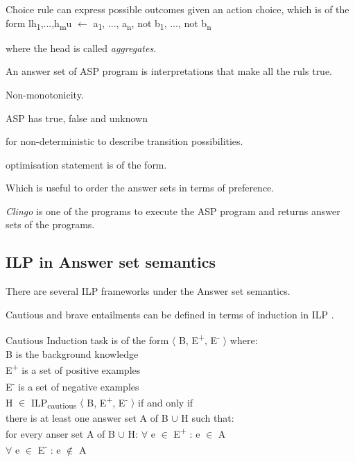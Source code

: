 \documentclass[12pt,twoside]{report}
\begin{document}
Choice rule can express possible outcomes given an action choice, which is of the form
l{h\textsubscript{1},...,h\textsubscript{m}}u $\leftarrow$ a\textsubscript{1}, ..., a\textsubscript{n}, not b\textsubscript{1}, ..., not b\textsubscript{n}

where the head is called \textit{aggregates}.

An answer set of ASP program is interpretations that make all the ruls true.

Non-monotonicity.

ASP has true, false and unknown

for non-deterministic to describe transition possibilities.

optimisation statement is of the form.

Which is useful to order the answer sets in terms of preference.

\textit{Clingo} is one of the programs to execute the ASP program and returns answer sets of the programs.


\subsection{ILP in Answer set semantics}

There are several ILP frameworks under the Answer set semantics.

Cautious and brave entailments can be defined in terms of induction in ILP \cite{Sakama2009}.


Cautious Induction task is of the form $\langle$ B, E\textsuperscript{+}, E\textsuperscript{-} $\rangle$ where: \\
B is the background knowledge \\
E\textsuperscript{+} is a set of positive examples \\
E\textsuperscript{-} is a set of negative examples \\

 H $\in$ ILP\textsubscript{cautious} $\langle$ B, E\textsuperscript{+}, E\textsuperscript{-} $\rangle$ if and only if  \\

 there is at least one answer set A of B $\cup$ H such that: \\
 for every anser set A of B $\cup$ H:
$\forall$ e $\in$ E\textsuperscript{+} : e $\in$ A \\
$\forall$ e $\in$ E\textsuperscript{-} : e $\notin$ A \\
\end{document}
